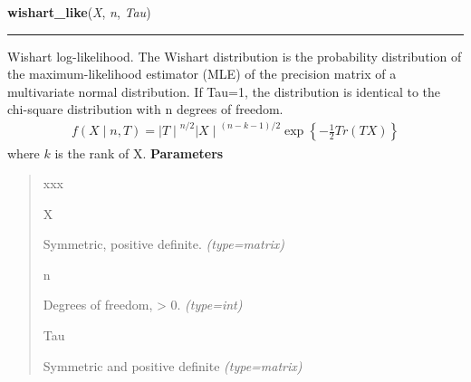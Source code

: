     \label{pymc:distributions:wishart_like}

    \vspace{0.5ex}

\hspace{.8\funcindent}\begin{boxedminipage}{\funcwidth}

    \raggedright \textbf{wishart\_like}(\textit{X}, \textit{n}, \textit{Tau})

    \vspace{-1.5ex}

    \rule{\textwidth}{1pt}
\setlength{\parskip}{2ex}

Wishart log-likelihood. The Wishart distribution is the probability
distribution of the maximum-likelihood estimator (MLE) of the precision
matrix of a multivariate normal distribution. If Tau=1, the distribution
is identical to the chi-square distribution with n degrees of freedom.
\begin{equation*}\begin{split}f(X \mid n, T) = {\mid T \mid}^{n/2}{\mid X \mid}^{(n-k-1)/2} \exp\left\{ -\frac{1}{2} Tr(TX) \right\}\end{split}\end{equation*}
where $k$ is the rank of X.
\setlength{\parskip}{1ex}
      \textbf{Parameters}
      \vspace{-1ex}

      \begin{quote}
        \begin{Ventry}{xxx}

          \item[X]


Symmetric, positive definite.
            {\it (type=matrix)}

          \item[n]


Degrees of freedom, {\textgreater} 0.
            {\it (type=int)}

          \item[Tau]


Symmetric and positive definite
            {\it (type=matrix)}

        \end{Ventry}

      \end{quote}

    \end{boxedminipage}

